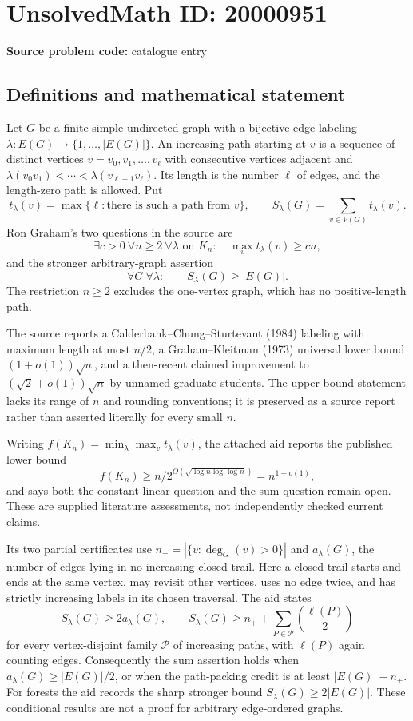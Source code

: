 \documentclass[11pt]{article}
\begin{document}
\section*{UnsolvedMath ID: 20000951}
\textbf{Source problem code:} catalogue entry
\subsection{Definitions and mathematical statement}
Let $G$ be a finite simple undirected graph with a bijective edge labeling $\lambda:E(G)\to\{1,\ldots,|E(G)|\}$. An increasing path starting at $v$ is a sequence of distinct vertices $v=v_0,v_1,\ldots,v_\ell$ with consecutive vertices adjacent and
$\lambda(v_0v_1)<\cdots<\lambda(v_{\ell-1}v_\ell)$. Its length is the number $\ell$ of edges, and the length-zero path is allowed. Put
\[
 t_\lambda(v)=\max\{\ell:\text{there is such a path from }v\},\qquad
 S_\lambda(G)=\sum_{v\in V(G)}t_\lambda(v).
\]
Ron Graham's two questions in the source are
\[
 \exists c>0\ \forall n\geq2\ \forall\lambda\text{ on }K_n:\quad
 \max_v t_\lambda(v)\geq cn,
\]
and the stronger arbitrary-graph assertion
\[
 \forall G\ \forall\lambda:\qquad S_\lambda(G)\geq |E(G)|.
\]
The restriction $n\geq2$ excludes the one-vertex graph, which has no positive-length path.

The source reports a Calderbank--Chung--Sturtevant (1984) labeling with maximum length at most $n/2$, a Graham--Kleitman (1973) universal lower bound $(1+o(1))\sqrt n$, and a then-recent claimed improvement to $(\sqrt2+o(1))\sqrt n$ by unnamed graduate students. The upper-bound statement lacks its range of $n$ and rounding conventions; it is preserved as a source report rather than asserted literally for every small $n$.

Writing $f(K_n)=\min_\lambda\max_v t_\lambda(v)$, the attached aid reports the published lower bound
\[
 f(K_n)\geq n/2^{O(\sqrt{\log n\log\log n})}=n^{1-o(1)},
\]
and says both the constant-linear question and the sum question remain open. These are supplied literature assessments, not independently checked current claims.

Its two partial certificates use $n_+=|\{v:\deg_G(v)>0\}|$ and $a_\lambda(G)$, the number of edges lying in no increasing closed trail. Here a closed trail starts and ends at the same vertex, may revisit other vertices, uses no edge twice, and has strictly increasing labels in its chosen traversal. The aid states
\[
 S_\lambda(G)\geq2a_\lambda(G),\qquad
 S_\lambda(G)\geq n_++\sum_{P\in\mathcal P}\binom{\ell(P)}2
\]
for every vertex-disjoint family $\mathcal P$ of increasing paths, with $\ell(P)$ again counting edges. Consequently the sum assertion holds when $a_\lambda(G)\geq|E(G)|/2$, or when the path-packing credit is at least $|E(G)|-n_+$. For forests the aid records the sharp stronger bound $S_\lambda(G)\geq2|E(G)|$. These conditional results are not a proof for arbitrary edge-ordered graphs.
\end{document}
